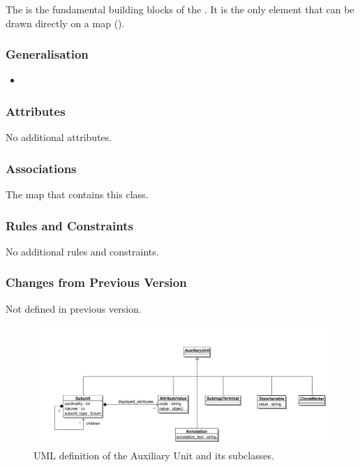 The  is the fundamental building blocks of the
\PDl. It is the only element that can be drawn directly on a map
().

\subsubsection{Generalisation}

\begin{itemize}
\item {}
\end{itemize}

\subsubsection{Attributes}

No additional attributes.

\subsubsection{Associations}

\begin{attributes}
 The map that contains this class.
\end{attributes}

\subsubsection{Rules and Constraints}

No additional rules and constraints.

\subsubsection{Changes from Previous Version}

Not defined in  previous version.


\label{defn:AuxiliaryUnit}

\begin{figure}[htb]
  \centering
  \includegraphics[width=\textwidth]{images/auxiliaryunituml}
\caption{UML definition of the Auxiliary Unit and its subclasses.}
  \label{fig:techref:auxiliaryunituml}
\end{figure}

